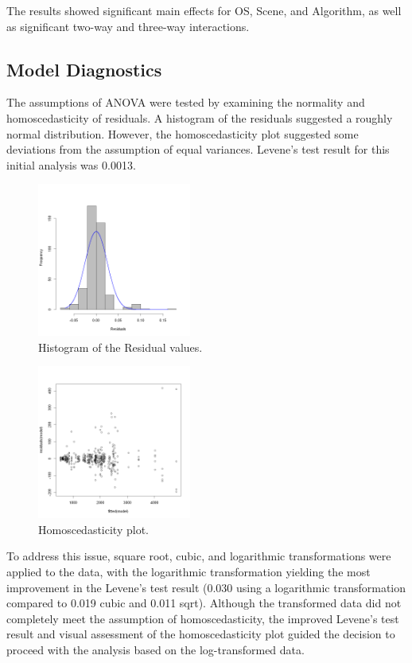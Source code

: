 \documentclass[conference]{IEEEtran}
\begin{document}
The results showed significant main effects for OS, Scene, and Algorithm, as well as significant two-way and three-way interactions.

\subsection{Model Diagnostics}

The assumptions of ANOVA were tested by examining the normality and homoscedasticity of residuals. A histogram of the residuals suggested a roughly normal distribution. However, the homoscedasticity plot suggested some deviations from the assumption of equal variances. Levene's test result for this initial analysis was 0.0013.

\begin{figure}[H]
    \label{int-scene-os}
    \centering
    \includegraphics[width=0.45\textwidth]{images/image3.png}
    \caption{Histogram of the Residual values.}
\end{figure}

\begin{figure}[H]
    \label{int-scene-os}
    \centering
    \includegraphics[width=0.45\textwidth]{images/image4.png}
    \caption{Homoscedasticity plot.}
\end{figure}

To address this issue, square root, cubic, and logarithmic transformations were applied to the data, with the logarithmic transformation yielding the most improvement in the Levene's test result (0.030 using a logarithmic transformation compared to 0.019 cubic and 0.011 sqrt). Although the transformed data did not completely meet the assumption of homoscedasticity, the improved Levene's test result and visual assessment of the homoscedasticity plot guided the decision to proceed with the analysis based on the log-transformed data.
\end{document}
